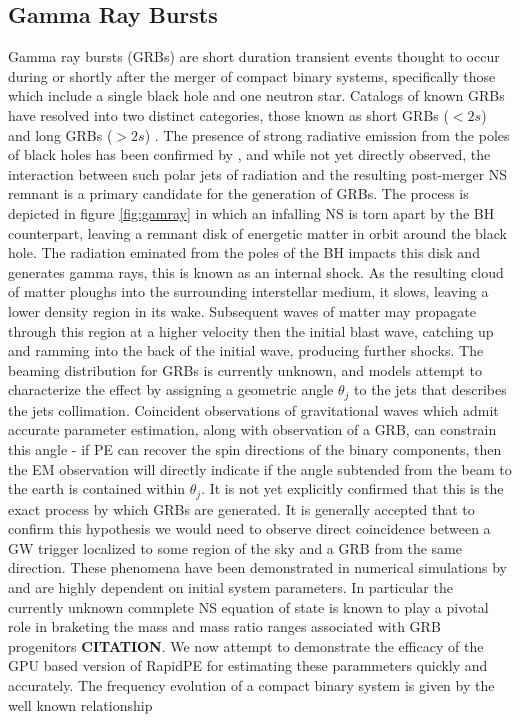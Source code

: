 \subsection{Gamma Ray Bursts}
Gamma ray bursts (GRBs) are short duration transient events thought to occur during or shortly after the merger of compact binary systems, specifically those which include a single black hole and one neutron star. Catalogs of known GRBs have resolved into two distinct categories, those known as short GRBs ($<2s$) and long GRBs ($>2s$) \cite{twogrb}. The presence of strong radiative emission from the poles of black holes has been confirmed by \cite{polarjet}, and while not yet directly observed, the interaction between such polar jets of radiation and the resulting post-merger NS remnant is a primary candidate for the generation of GRBs. The process is depicted in figure \ref{fig:gamray} in which an infalling NS is torn apart by the BH counterpart, leaving a remnant disk of energetic matter in orbit around the black hole. The radiation eminated from the poles of the BH impacts this disk and generates gamma rays, this is known as an internal shock. As the resulting cloud of matter ploughs into the surrounding interstellar medium, it slows, leaving a lower density region in its wake. Subsequent waves of matter may propagate through this region at a higher velocity then the initial blast wave, catching up and ramming into the back of the initial wave, producing further shocks.
The beaming distribution for GRBs is currently unknown, and models \cite{grbopen} attempt to characterize the effect by assigning a geometric angle $\theta_j$ to the jets that describes the jets collimation. Coincident observations of gravitational waves which admit accurate parameter estimation, along with observation of a GRB, can constrain this angle - if PE can recover the spin directions of the binary components, then the EM observation will directly indicate if the angle subtended from the beam to the earth is contained within $\theta_j$.
It is not yet explicitly confirmed that this is the exact process by which GRBs are generated. It is generally accepted that to confirm this hypothesis we would need to observe direct coincidence between a GW trigger localized to some region of the sky and a GRB from the same direction. These phenomena have been demonstrated in numerical simulations by \cite{kilonova} and are highly dependent on initial system parameters. In particular the currently unknown commplete NS equation of state is known to play a pivotal role in braketing the mass and mass ratio ranges associated with GRB progenitors \textbf{CITATION}.  We now attempt to demonstrate the efficacy of the GPU based version of RapidPE for estimating these parammeters quickly and accurately. The frequency evolution of a compact binary system is given by the well known relationship

